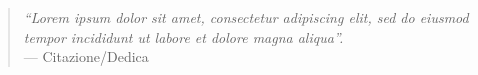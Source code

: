 \documentclass[12pt]{book}
\begin{document}
\frontmatter
{}


\newpage
\thispagestyle{empty}
\vspace*{\fill}
\begin{quote}
\centering
\emph{``Lorem ipsum dolor sit amet, consectetur adipiscing elit, sed do eiusmod tempor incididunt ut labore et dolore magna aliqua''.}\\
\vspace*{2ex}
--- Citazione/Dedica
\end{quote}
\vspace*{\fill}

\begin{spacing}{1.3}
\tableofcontents
\clearpage
\listoffigures
\clearpage
\listoftables
\end{spacing}



\mainmatter


\backmatter
\printbibliography
\end{document}
